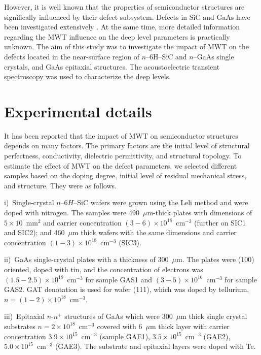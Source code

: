 \documentclass[10pt]{iopart}
\begin{document}
However, it is well known that the properties of semiconductor structures are significally influenced by their defect subsystem.
Defects in SiC and GaAs have been investigated extensively \cite{SiCDavid,SiCWei,GAPel2020,GASobolev2020}.
At the same time,
more detailed information regarding the MWT influence on the deep level parameters is practically unknown.
The aim of this study was to investigate the impact of MWT on the defects located in the near-surface region 
of $n$--6H--SiC and $n$--GaAs single crystals,
and  GaAs  epitaxial structures.
The  acoustoelectric  transient spectroscopy was used to characterize the deep levels.

\section{Experimental details}\label{sec:Exp}

It has been reported \cite{BoltovetsEn,Milenin1994En,BelyaevIntac,ASHKINADZE1996,ProcSPIE} that
the impact of MWT on semiconductor structures depends on many factors.
The primary factors are the initial level of structural perfectness, conductivity, dielectric permittivity, and structural topology.
To estimate the effect of MWT on the defect parameters, we selected different samples based on the doping degree, initial level of residual mechanical stress, and structure.
They were as follows.

\noindent
i)~Single-crystal $n$--6$H$--SiC wafers were grown using the Leli method and were doped with nitrogen.
   The samples were  490~$\mu$m-thick plates with dimensions of $5\times10$~mm$^2$ and  carrier concentration $(3-6)\times10^{18}$~cm$^{-3}$
    (further on SIC1 and SIC2);
    and 460~$\mu$m thick wafers with the same dimensions and carrier concentration  $(1-3)\times10^{18}$~cm$^{-3}$ (SIC3).

\noindent
ii)~GaAs single-crystal plates with a thickness of 300~$\mu$m.
   The plates were (100) oriented, doped with tin, and the concentration of electrons was $(1.5-2.5)\times10^{18}$~cm$^{-3}$
   for sample  GAS1 and $(3-5)\times10^{16}$~cm$^{-3}$ for sample GAS2.
   GAT denotation is used for wafer (111), which was doped by tellurium,
   $n = (1-2)\times10^{18}$~cm$^{-3}$.

\noindent
iii)~Epitaxial $n$-$n^+$ structures of GaAs which were 300~$\mu$m thick single crystal substrates $n = 2 \times10^{18}$~cm$^{-3}$
   covered with 6~$\mu$m thick layer with carrier concentration $3.9\times10^{15}$~cm$^{-3}$
   (sample GAE1), $3.5\times10^{15}$~cm$^{-3}$ (GAE2),
   $5.0\times10^{15}$~cm$^{-3}$ (GAE3).
   The substrate and epitaxial layers were doped with Te.
\end{document}
